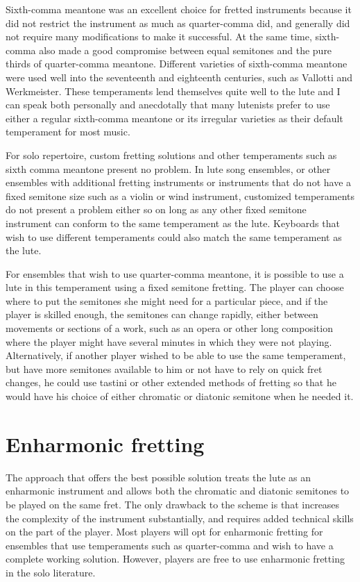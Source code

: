 Sixth-comma meantone was an excellent choice for fretted instruments because it did not
restrict the instrument as much as quarter-comma did, and generally did not require
many modifications to make it successful. At the same time, sixth-comma also made a
good compromise between equal semitones and the pure thirds of quarter-comma meantone.
Different varieties of sixth-comma meantone were used well into the seventeenth and
eighteenth centuries, such as Vallotti and Werkmeister. These temperaments lend
themselves quite well to the lute and I can speak both personally and anecdotally that
many lutenists prefer to use either a regular sixth-comma meantone or its irregular
varieties as their default temperament for most music.

For solo repertoire, custom fretting solutions and other temperaments such as sixth
comma meantone present no problem.  In lute song ensembles, or other ensembles with
additional fretting instruments or instruments that do not have a fixed semitone size
such as a violin or wind instrument, customized temperaments do not present a problem
either so on long as any other fixed semitone instrument can conform to the same
temperament as the lute.  Keyboards that wish to use different temperaments could also
match the same temperament as the lute.

For ensembles that wish to use quarter-comma meantone, it is possible to use a lute in
this temperament using a fixed semitone fretting. The player can choose where to put
the semitones she might need for a particular piece, and if the player is skilled
enough, the semitones can change rapidly, either between movements or sections of a
work, such as an opera or other long composition where the player might have several
minutes in which they were not playing. Alternatively, if another player wished to be
able to use the same temperament, but have more semitones available to him or not have
to rely on quick fret changes, he could use tastini or other extended methods of
fretting so that he would have his choice of either chromatic or diatonic semitone when
he needed it.

\section{Enharmonic fretting}

The approach that offers the best possible solution treats the lute as an enharmonic
instrument and allows both the chromatic and diatonic semitones to be played on the
same fret. The only drawback to the scheme is that increases the complexity of the
instrument substantially, and requires added technical skills on the part of the
player. Most players will opt for enharmonic fretting for ensembles that use
temperaments such as quarter-comma and wish to have a complete working solution.
However, players are free to use enharmonic fretting in the solo literature.

